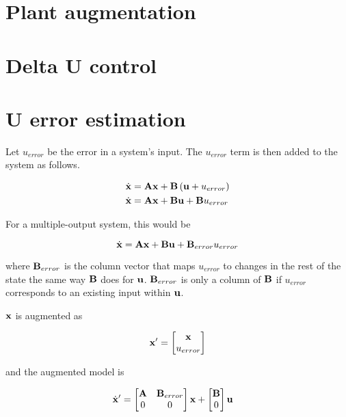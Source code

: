 \section{Plant augmentation}

\section{Delta U control}

\section{U error estimation}

Let $u_{error}$ be the error in a system's input. The $u_{error}$ term is then
added to the system as follows.

\begin{align*}
  \dot{\mathbf{x}} &= \mathbf{A}\mathbf{x} + \mathbf{B}\left(\mathbf{u} + u_{error}\right) \\
  \dot{\mathbf{x}} &= \mathbf{A}\mathbf{x} + \mathbf{B}\mathbf{u} + \mathbf{B}u_{error}
\end{align*}

For a multiple-output system, this would be

\begin{equation*}
  \dot{\mathbf{x}} = \mathbf{A}\mathbf{x} + \mathbf{B}\mathbf{u} + \mathbf{B}_{error}u_{error}
\end{equation*}

where $\mathbf{B}_{error}$ is the column vector that maps $u_{error}$ to changes in
the rest of the state the same way $\mathbf{B}$ does for $\mathbf{u}$.
$\mathbf{B}_{error}$ is only a column of $\mathbf{B}$ if $u_{error}$ corresponds to an
existing input within $\mathbf{u}$.

$\mathbf{x}$ is augmented as

\begin{equation*}
  \mathbf{x'} =
  \begin{bmatrix}
    \mathbf{x} \\
    u_{error}
  \end{bmatrix}
\end{equation*}

and the augmented model is

\begin{align*}
  \dot{\mathbf{x}}' &=
  \begin{bmatrix}
    \mathbf{A} & \mathbf{B}_{error} \\
    0 & 0
  \end{bmatrix}
  \mathbf{x} +
  \begin{bmatrix}
    \mathbf{B} \\
    0
  \end{bmatrix}
  \mathbf{u}
\end{align*}

